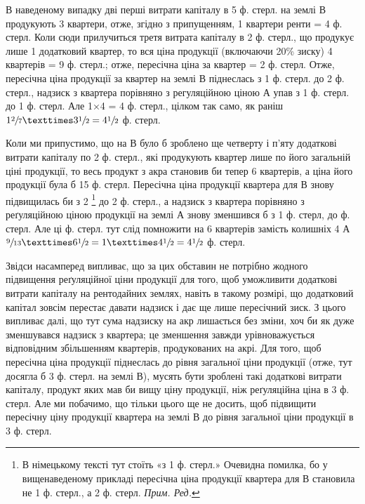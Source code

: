 В наведеному випадку дві перші витрати капіталу в 5 ф. стерл. на землі В
продукують 3 квартери, отже, згідно з припущенням, 1
квартери ренти = 4 ф. стерл. Коли сюди прилучиться третя витрата
капіталу в 2 ф. стерл.,
що продукує лише 1 додатковий квартер, то вся ціна продукції (включаючи 20\%
зиску) 4 квартерів = 9 ф. стерл.; отже, пересічна ціна за
квартер = 2 ф. стерл. Отже, пересічна ціна продукції за квартер на землі В
піднеслась з 1 ф. стерл.
до 2 ф. стерл., надзиск з квартера порівняно з регуляційною ціною А упав
з 1 ф. стерл. до 1 ф. стерл. Але 1×4 = 4 ф.
стерл., цілком так само,
як раніш $1\sfrac{2}{7} × 3\sfrac{1}{2} = 4\sfrac{1}{2}$ ф. стерл.

Коли ми припустимо, що на В було б зроблено ще четверту і п’яту додаткові
витрати капіталу по 2   ф. стерл., які продукують квартер лише по його
загальній ціні продукції, то весь продукт з акра становив би тепер 6 квартерів,
а ціна його продукції була б 15 ф. стерл. Пересічна ціна продукції
квартера для В знову підвищилась би з 2
\footnote*{В німецькому тексті тут стоїть «з 1 ф. стерл.» Очевидна помилка,
бо у вищенаведеному прикладі пересічна ціна продукції квартера для В
становила не 1 ф. стерл., а 2 ф. стерл. \emph{Прим. Ред.}}
до 2 ф. стерл., а надзиск з квартера
порівняно з реґуляційною ціною продукції на землі А знову зменшився
б з 1 ф. стерл, до  ф. стерл. Але ці  ф. стерл. тут слід
помножити на 6 квартерів замість колишніх 4
А $\sfrac{9}{13}×6 \sfrac{1}{2} = 1× 4 \sfrac{1}{2} = 4 \sfrac{1}{2}$ ф. стерл.

Звідси насамперед випливає, що за цих обставин не потрібно жодного підвищення
реґуляційної ціни продукції для того, щоб уможливити додаткові витрати
капіталу на рентодайних землях, навіть в такому розмірі, що додатковий
капітал зовсім перестає давати надзиск і дає ще лише пересічний зиск. З
цього випливає далі, що тут сума надзиску на акр лишається без зміни,
хоч би як дуже зменшувався надзиск з квартера; це зменшення завжди урівноважується
відповідним збільшенням квартерів, продукованих на акрі. Для того,
щоб пересічна ціна продукції піднеслась до рівня загальної ціни продукції (отже,
тут досягла б 3 ф. стерл. на землі В), мусять бути зроблені такі додаткові витрати
капіталу, продукт яких мав би вищу ціну продукції, ніж реґуляційна ціна
в 3 ф. стерл. Але ми побачимо, що тільки цього ще не досить, щоб підвищити
пересічну ціну продукції квартера на землі В до рівня загальної ціни продукції
в 3 ф. стерл.

